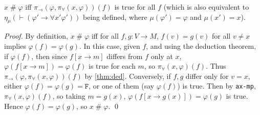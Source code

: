 \documentclass[runningheads,a4paper]{llncs}
\newcommand{\vph}{\varphi}
\newcommand{\fresh}{\mathbin{\#}}
\newcommand{\tF}{\texttt{F}}
\begin{document}
\begin{lemma}\label{thm:nf}
$x\fresh\vph$ iff $\pi_\to(\vph,\pi_\forall(x,\vph))(f)$ is true for all $f$ (which is also equivalent to $\eta_\mu(\vdash(\vph'\to\forall x'\vph'))$ being defined, where $\mu(\vph')=\vph$ and $\mu(x')=x$).
\end{lemma}
\begin{proof}
By definition, $x\fresh\vph$ iff for all $f,g:V\to M$, $f(v)=g(v)$ for all $v\ne x$ implies $\vph(f)=\vph(g)$.  In this case, given $f$, and using the deduction theorem, if $\vph(f)$, then since $f[x\to m]$ differs from $f$ only at $x$,  $\vph(f[x\to m])=\vph(f)$ is true for each $m$, so $\pi_\forall(x,\vph)(f)$. Thus $\pi_\to(\vph,\pi_\forall(x,\vph))(f)$ by \autoref{thm:ded}. Conversely, if $f,g$ differ only for $v=x$, either $\vph(f)=\vph(g)=\tF$, or one of them (say $\vph(f)$) is true. Then by \texttt{ax-mp}, $\pi_\forall(x,\vph)(f)$, so taking $m=g(x)$, $\vph(f[x\to g(x)])=\vph(g)$ is true. Hence $\vph(f)=\vph(g)$, so $x\fresh\vph$.
\qed\end{proof}
\end{document}
